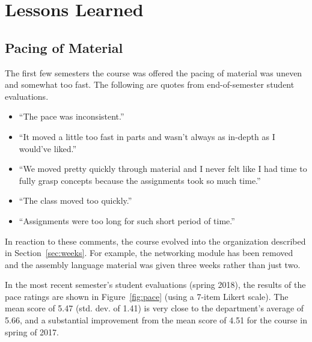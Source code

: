 \section{Lessons Learned}
\label{sec:lessons}


\subsection{Pacing of Material}



The first few semesters the course was offered the pacing of material was uneven and somewhat too fast.  The following are quotes from end-of-semester student evaluations.
\begin{itemize}
\item ``The pace was inconsistent.''
\item ``It moved a little too fast in parts and wasn't always as
in-depth as I would've liked.''
\item ``We moved pretty quickly through material and I never felt like I had
time to fully grasp concepts because the assignments took so much time.''
\item ``The class moved too quickly.''
\item ``Assignments were too long for such short period of time.''
\end{itemize}

In reaction to these comments, the course evolved into the organization described in Section~\ref{sec:weeks}.  For example, the networking module has been removed and the assembly language material was given three weeks rather than just two.

In the most recent semester's student evaluations (spring 2018), the results of the pace ratings are shown in Figure~\ref{fig:pace} (using a 7-item Likert scale). The mean score of 5.47 (std. dev. of 1.41) is very close to the department's average of 5.66, and a substantial improvement from the mean score of 4.51 for the course in spring of 2017.

